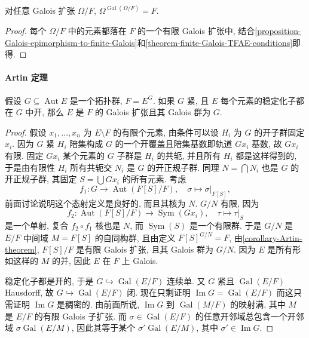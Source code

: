 \begin{proposition}
  \label{proposition-Galois-stable-field}
  对任意 Galois 扩张 \( \Omega/F \), \( \Omega^{\operatorname{Gal}(\Omega/F)} =
  F \).
\end{proposition}
\begin{proof}
  每个 \( \Omega / F \) 中的元素都落在 \( F \) 的一个有限 Galois 扩张中,
  结合\cref{proposition-Galois-epimorphism-to-finite-Galois}和\cref{theorem-finite-Galois-TFAE-conditions}即得.
\end{proof}

\paragraph{Artin 定理}

\begin{proposition}[Artin]
  假设 \( G \subseteq \operatorname{Aut} E \) 是一个拓扑群, \( F = E^G \).
  如果 \( G \) 紧, 且 \( E \) 每个元素的稳定化子都在 \( G \) 中开, 那么 \( E \)
  是 \( F \) 的 Galois 扩张且其 Galois 群为 \( G \).
\end{proposition}
\begin{proof}
  假设 \( x_1, \ldots, x_n \) 为 \( E \setminus F \) 的有限个元素, 由条件可以设
  \( H_i \) 为 \( G \) 的开子群固定 \( x_i \).
  因为 \( G \) 紧 \( H_i \) 陪集构成 \( G \) 的一个开覆盖且陪集基数即轨道 \(
  Gx_i \) 基数, 故 \( Gx_i \) 有限.
  固定 \( Gx_i \) 某个元素的 \( G \) 子群是 \( H_i \) 的共轭, 并且所有 \( H_i \)
  都是这样得到的, 于是由有限性 \( H_i \) 所有共轭交 \( N_i \) 是 \( G \)
  的开正规子群.
  同理 \( N = \bigcap N_i \) 也是 \( G \) 的开正规子群, 其固定 \( S = \bigcup
  Gx_i \) 的所有元素.
  考虑
  \[
    f_1: G \to \operatorname{Aut}(F[S]/F),\quad \sigma \mapsto
    \left. \sigma \right\vert_{F[S]},
  \]
  前面讨论说明这个态射定义是良好的, 而且其核为 \( N \).
  \( G/N \) 有限, 因为
  \[
    f_2: \operatorname{Aut}(F[S]/F) \to \operatorname{Sym}(Gx_i),\quad \tau
    \mapsto \left. \tau \right\vert_{S}
  \]
  是一个单射, 复合 \( f_2 \circ f_1 \) 核也是 \( N \), 而 \(
  \operatorname{Sym}(S) \) 是一个有限群.
  于是 \( G / N \) 是 \( E/F \) 中间域 \( M = F[S] \) 的自同构群, 且由定义 \(
  F[S]^{G/N} = F \), 由\cref{corollary-Artin-theorem}, \( F[S]/F \) 是有限
  Galois 扩张, 且其 Galois 群为 \( G/N \).
  因为 \( E \) 是所有形如这样的 \( M \) 的并, 因此 \( E \) 在 \( F \) 上 Galois.

  稳定化子都是开的, 于是 \( G \hookrightarrow \operatorname{Gal}(E/F) \) 连续单.
  又 \( G \) 紧且 \( \operatorname{Gal}(E/F) \) Hausdorff, 故 \( G
  \hookrightarrow \operatorname{Gal}(E/F) \) 闭.
  现在只剩证明 \( \operatorname{Im} G = \operatorname{Gal}(E/F) \) 而这只需证明
  \( \operatorname{Im} G \) 是稠密的.
  由前面所说, \( \operatorname{Im}G \) 到 \( \operatorname{Gal}(M/F) \)
  的映射满, 其中 \( M \) 是 \( E/F \) 的有限 Galois 子扩张.
  而 \( \sigma \in \operatorname{Gal}(E/F) \) 的任意开邻域总包含一个开邻域 \(
  \sigma \operatorname{Gal}(E/M) \), 因此其等于某个 \( \sigma'
  \operatorname{Gal}(E/M) \), 其中 \( \sigma' \in \operatorname{Im} G \).
\end{proof}

